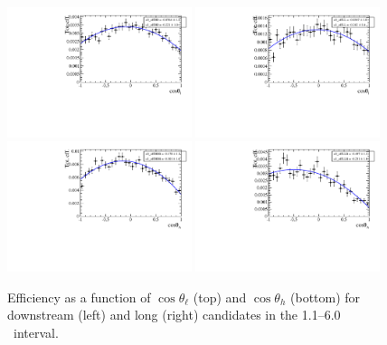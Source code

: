 \begin{figure}[h]
\centering
\includegraphics[width=0.48\textwidth]{Lmumu/figs/efficiencies/angular/DDeffFit_q2_110_600.pdf}
\includegraphics[width=0.48\textwidth]{Lmumu/figs/efficiencies/angular/LLeffFit_q2_110_600.pdf}
\includegraphics[width=0.48\textwidth]{Lmumu/figs/efficiencies/angular/DDeffFitB_q2_110_600.pdf}
\includegraphics[width=0.48\textwidth]{Lmumu/figs/efficiencies/angular/LLeffFitB_q2_110_600.pdf}
\caption{Efficiency as a function of $\cos\theta_\ell$ (top) and $\cos\theta_h$ (bottom) for
downstream (left) and long (right) candidates in the 1.1--6.0 \gevgevcccc ~\qsq interval.  }
\label{fig:cosThetaBeffLow}
\end{figure}
%
